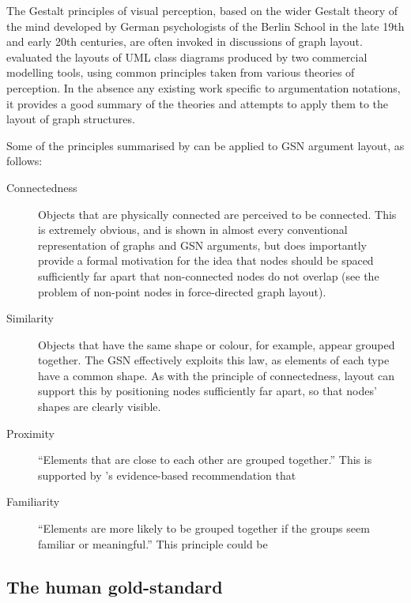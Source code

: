 The Gestalt principles of visual perception,
based on the wider Gestalt theory of the mind developed by German psychologists of the Berlin School in the late 19th and early 20th centuries,
are often \citep[pp.~136]{storrle} invoked in discussions of graph layout.
\citet{kennysun} evaluated the layouts of UML class diagrams produced by two commercial modelling tools, using common principles taken from various theories of perception.
In the absence any existing work specific to argumentation notations, it provides a good summary of the theories and attempts to apply them to the layout of graph structures.

Some of the principles summarised by \citet{kennysun} can be applied to GSN argument layout, as follows:

\begin{description}
    \item[Connectedness] Objects that are physically connected are perceived to be connected. This is extremely obvious, and is shown in almost every conventional representation of graphs and GSN arguments, but does importantly provide a formal motivation for the idea that nodes should be spaced sufficiently far apart that non-connected nodes do not overlap (see the problem of non-point nodes in force-directed graph layout). 

    \item[Similarity] Objects that have the same shape or colour, for example, appear grouped together.
    The GSN effectively exploits this law, as elements of each type have a common shape. As with the principle of connectedness, layout can support this by positioning nodes sufficiently far apart, so that nodes' shapes are clearly visible.
    
    \item[Proximity] ``Elements that are close to each other are grouped together.'' This is supported by \citet{huang2007effects}'s evidence-based recommendation that 
    
    \item[Familiarity] ``Elements are more likely to be grouped together if the groups seem familiar or meaningful.'' This principle could be 
    
\end{description}



\subsection{The human gold-standard \label{sec:humangold}}

